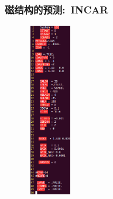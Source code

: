 \documentclass[cjk,slidestop,compress,mathserif,blue]{beamer}
\begin{document}
\frame
{
	\frametitle{\textrm{}磁结构的预测:~\textrm{INCAR}}
\begin{figure}[h!]
\vspace*{-0.20in}
\centering
\includegraphics[height=3.00in,width=0.80in]{Figures/MagGene-UO2-INCAR.png}
\label{Fig:UO2-INCAR}
\end{figure}
}

\end{document}
